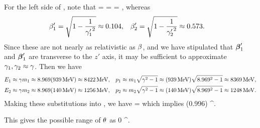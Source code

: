 \begin{solution}
	For the left side of , note that
	\beq
		\gam = 
		= \frac{\ELam}{\mLam}
		\approx \gamLam
		\qimplies
		\bet = 
		,
	\eeq
	whereas
	\begin{align*}
		\beta_1' &= \sqrt{1 - \frac{1}{{\gamma_1'}^2}}
		\approx 0.104, &
		\beta_2' &= \sqrt{1 - \frac{1}{{\gamma_2'}^2}}
		\approx 0.573. &
	\end{align*}
	Since these are not nearly as relativistic as $\beta$, and we have stipulated that $\boldsymbol{\beta}'_1$ and $\boldsymbol{\beta}'_1$ are transverse to the $z'$ axis, it may be sufficient to approximate $\gamma_1, \gamma_2 \approx \gamma$.  Then we have
	\begin{align*}
		\Eq &\approx \gam \mq
		\approx \gamLam (\mnuc)
		\approx \Enuc, &
		\pq &\approx \mq \sqrt{\gam^2 - 1}
		\approx (\mnuc) \sqrt{\gamLam^2 - 1}
		\approx \pnuc, \\
		\Ew &\approx \gam \mw
		\approx \gamLam (\mpi)
		\approx \Epi, &
		\pw &\approx \mw \sqrt{\gam^2 - 1}
		\approx (\mpi) \sqrt{\gamLam^2 - 1}
		\approx \ppi.
	\end{align*}
	Making these substitutions into , we have
	\beq
		\cos\tht = 
	\eeq
	which implies
	\beq
		\max\tht \approx \cos[-1](0.996)
		^\circ.
	\eeq
	
	This gives the possible range of $\theta$ as
	\beq
		{\color{blue} 0 \leq \tht {}^\circ}.
	\eeq
\end{solution}

